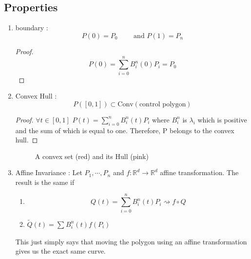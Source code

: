 \subsection{Properties}
\label{subsec:Properties}
\begin{enumerate}[label={(\alph*)}]
    \item boundary : 
        \[
            P(0) = P_0 \qquad \text{ and } P(1) = P_n
        \]
        \begin{proof}
            \[
                P(0) = \sum_{i=0}^{n} B _{ i }^{ n  } (0)P_i = P_0 
            \]
        \end{proof}
    \item Convex Hull : 
        \[
            P\left( [0,1]\right) \subset \text{Conv}\left( \text{control polygon} \right)  
        \]
        \begin{proof}
            $ \forall t \in [0,1] $ $ P(t) = \sum_{i=0}^{n} B _{ i }^{ n }(t) P_i   $
            where $ B _{ i }^{ n  }  $ is $ \lambda_i  $ which is positive and the sum of
            which is equal to one. Therefore, P belongs to the convex hull. 
        \end{proof}
\newpage
        \begin{figure}[ht]
    \centering
    \caption{A convex set (red) and its Hull (pink)}
    \label{fig:convex-hull}
\end{figure}



    \item Affine Invariance : 
        Let $ P_1, \cdots, P_n $ and $ f: \mathbb{R}^d \to \mathbb{R}^d $ affine
        transformation. The result is the same if 
        \begin{enumerate}
            \item \[
                    Q(t) = \sum_{i=0}^{n} B _{ i }^{ n  } (t)P_i \rightsquigarrow f
                    \circ Q 
            \]
        \item $\widetilde{Q}(t) = \sum_{}^{} B _{ i }^{ n }(t)f(P_i) $
        \end{enumerate}
        This just simply says that moving the polygon using an affine transformation gives
        us the exact same curve. 


\end{enumerate}
